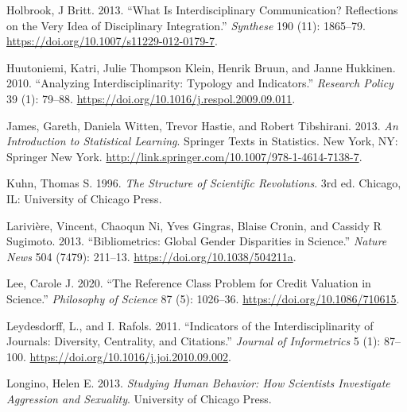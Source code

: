 \documentclass[
  11pt,
]{article}
\newlength{\cslhangindent}
\newenvironment{CSLReferences}[2] %
 {%
  \setlength{\parindent}{0pt}
  \ifodd #1 \everypar{\setlength{\hangindent}{\cslhangindent}}\ignorespaces\fi
  \ifnum #2 > 0
  \setlength{\parskip}{#2\baselineskip}
  \fi
 }%
 {}
\begin{document}
\begin{CSLReferences}{1}{0}
\leavevmode{}%
Holbrook, J Britt. 2013. {``What Is Interdisciplinary Communication? Reflections on the Very Idea of Disciplinary Integration.''} \emph{Synthese} 190 (11): 1865--79. \url{https://doi.org/10.1007/s11229-012-0179-7}.

\leavevmode{}%
Huutoniemi, Katri, Julie Thompson Klein, Henrik Bruun, and Janne Hukkinen. 2010. {``Analyzing Interdisciplinarity: Typology and Indicators.''} \emph{Research Policy} 39 (1): 79--88. \url{https://doi.org/10.1016/j.respol.2009.09.011}.

\leavevmode{}%
James, Gareth, Daniela Witten, Trevor Hastie, and Robert Tibshirani. 2013. \emph{An Introduction to Statistical Learning}. Springer Texts in Statistics. New York, NY: Springer New York. \url{http://link.springer.com/10.1007/978-1-4614-7138-7}.

\leavevmode{}%
Kuhn, Thomas S. 1996. \emph{The Structure of Scientific Revolutions}. 3rd ed. Chicago, IL: University of Chicago Press.

\leavevmode{}%
Larivière, Vincent, Chaoqun Ni, Yves Gingras, Blaise Cronin, and Cassidy R Sugimoto. 2013. {``Bibliometrics: Global Gender Disparities in Science.''} \emph{Nature News} 504 (7479): 211--13. \url{https://doi.org/10.1038/504211a}.

\leavevmode{}%
Lee, Carole J. 2020. {``The Reference Class Problem for Credit Valuation in Science.''} \emph{Philosophy of Science} 87 (5): 1026--36. \url{https://doi.org/10.1086/710615}.

\leavevmode{}%
Leydesdorff, L., and I. Rafols. 2011. {``Indicators of the Interdisciplinarity of Journals: Diversity, Centrality, and Citations.''} \emph{Journal of Informetrics} 5 (1): 87--100. \url{https://doi.org/10.1016/j.joi.2010.09.002}.

\leavevmode{}%
Longino, Helen E. 2013. \emph{Studying Human Behavior: How Scientists Investigate Aggression and Sexuality}. University of Chicago Press.


\end{CSLReferences}
\end{document}
